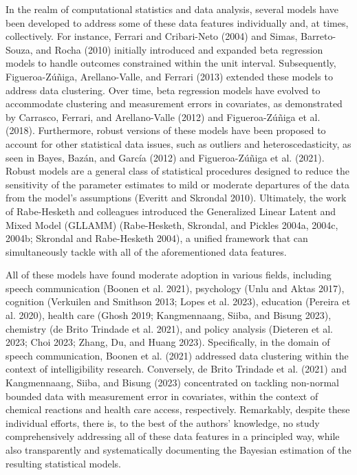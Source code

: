 \documentclass[
sn-apacite
]{sn-jnl}
\begin{document}
In the realm of computational statistics and data analysis, several
models have been developed to address some of these data features
individually and, at times, collectively. For instance, Ferrari and
Cribari-Neto (2004) and Simas, Barreto-Souza, and Rocha (2010) initially
introduced and expanded beta regression models to handle outcomes
constrained within the unit interval. Subsequently, Figueroa-Zúñiga,
Arellano-Valle, and Ferrari (2013) extended these models to address data
clustering. Over time, beta regression models have evolved to
accommodate clustering and measurement errors in covariates, as
demonstrated by Carrasco, Ferrari, and Arellano-Valle (2012) and
Figueroa-Zúñiga et al. (2018). Furthermore, robust versions of these
models have been proposed to account for other statistical data issues,
such as outliers and heteroscedasticity, as seen in Bayes, Bazán, and
García (2012) and Figueroa-Zúñiga et al. (2021). Robust models are a
general class of statistical procedures designed to reduce the
sensitivity of the parameter estimates to mild or moderate departures of
the data from the model's assumptions (Everitt and Skrondal 2010).
Ultimately, the work of Rabe-Hesketh and colleagues introduced the
Generalized Linear Latent and Mixed Model (GLLAMM) (Rabe-Hesketh,
Skrondal, and Pickles 2004a, 2004c, 2004b; Skrondal and Rabe-Hesketh
2004), a unified framework that can simultaneously tackle with all of
the aforementioned data features.

All of these models have found moderate adoption in various fields,
including speech communication (Boonen et al. 2021), psychology (Unlu
and Aktas 2017), cognition (Verkuilen and Smithson 2013; Lopes et al.
2023), education (Pereira et al. 2020), health care (Ghosh 2019;
Kangmennaang, Siiba, and Bisung 2023), chemistry (de Brito Trindade et
al. 2021), and policy analysis (Dieteren et al. 2023; Choi 2023; Zhang,
Du, and Huang 2023). Specifically, in the domain of speech
communication, Boonen et al. (2021) addressed data clustering within the
context of intelligibility research. Conversely, de Brito Trindade et
al. (2021) and Kangmennaang, Siiba, and Bisung (2023) concentrated on
tackling non-normal bounded data with measurement error in covariates,
within the context of chemical reactions and health care access,
respectively. Remarkably, despite these individual efforts, there is, to
the best of the authors' knowledge, no study comprehensively addressing
all of these data features in a principled way, while also transparently
and systematically documenting the Bayesian estimation of the resulting
statistical models.
\end{document}
